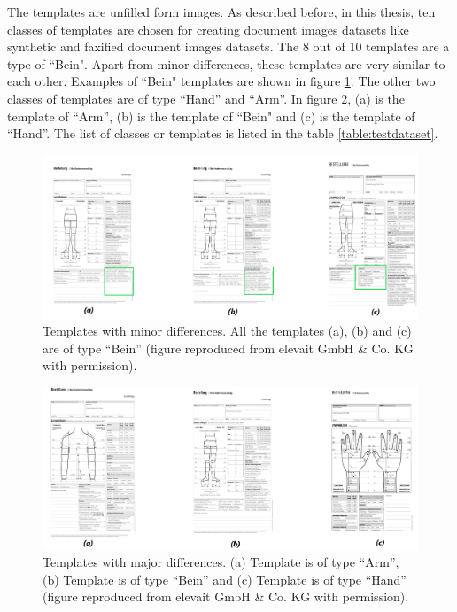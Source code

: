 The templates are unfilled form images. As described before, in this thesis, ten classes of templates are chosen for creating document images datasets like synthetic and faxified document images datasets. The 8 out of 10 templates are a type of ``Bein". Apart from minor differences, these templates are very similar to each other. Examples of ``Bein" templates are shown in figure \ref{fig:TemplatesWithMinorDifference}. The other two classes of templates are of type ``Hand'' and ``Arm''. In figure \ref{fig:TemplatesWithMajorDifference}, (a) is the template of ``Arm'', (b) is the template of ``Bein" and (c) is the template of ``Hand''. The list of classes or templates is listed in the table \ref{table:testdataset}.

\begin{figure}[H]
        \begin{center}
	    \includegraphics[scale=0.30]{images/Implementation/TemplatesWithMinorDifference.png}
	    \caption[Templates with minor differences.]{Templates with minor differences. All the templates (a), (b) and (c) are of type ``Bein'' (figure reproduced from elevait GmbH \& Co. KG with permission).}
	    \label{fig:TemplatesWithMinorDifference}
	    \end{center}
\end{figure}



\begin{figure}[H]
        \begin{center}
	    \includegraphics[scale=0.30]{images/Implementation/TemplatesWithMajorDifference.png}
	    \caption[Templates with major differences.]{Templates with major differences. (a) Template is of type ``Arm'', (b) Template is of type ``Bein'' and (c) Template is of type ``Hand'' (figure reproduced from elevait GmbH \& Co. KG with permission).}
	    \label{fig:TemplatesWithMajorDifference}
	    \end{center}
\end{figure}





